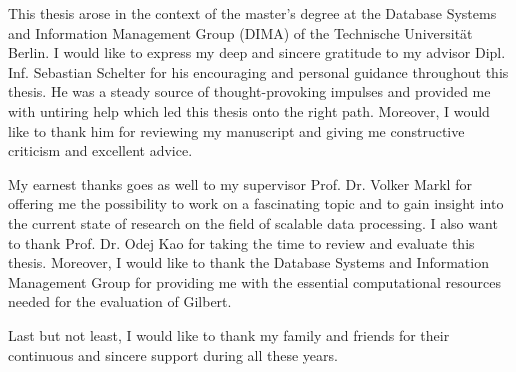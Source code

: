 \clearemptydoublepage
{}
{}	



\vspace*{2cm}

\begin{center}
\end{center}

\vspace{1cm}

This thesis arose in the context of the master’s degree at the Database Systems and Information Management Group (DIMA) of the Technische Universität Berlin. 
I would like to express my deep and sincere gratitude to my advisor Dipl. Inf. Sebastian Schelter for his encouraging and personal guidance throughout this thesis. 
He was a steady source of thought-provoking impulses and provided me with untiring help which led this thesis onto the right path. 
Moreover, I would like to thank him for reviewing my manuscript and giving me constructive criticism and excellent advice.

My earnest thanks goes as well to my supervisor Prof. Dr. Volker Markl for offering me the possibility to work on a fascinating topic and to gain insight into the current state of research on the field of scalable data processing.
I also want to thank Prof. Dr. Odej Kao for taking the time to review and evaluate this thesis.
Moreover, I would like to thank the Database Systems and Information Management Group for providing me with the essential computational resources needed for the evaluation of Gilbert.

Last but not least, I would like to thank my family and friends for their continuous and sincere support during all these years.